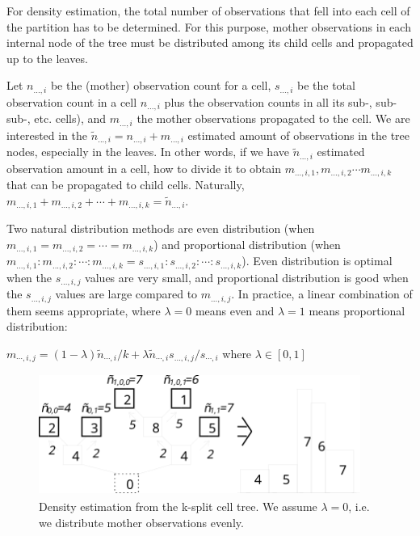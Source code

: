 For density estimation, the total number of observations that
fell into each cell of the partition has to be determined. For
this purpose, mother observations in each internal node of the
tree must be distributed among its child cells and propagated
up to the leaves.


Let $n_{...,i}$ be the (mother) observation count for a cell,
$s_{...,i}$ be the total observation count in a cell $n_{...,i}$ plus
the observation counts in all its sub-, sub-sub-, etc. cells), and
$m_{...,i}$ the mother observations propagated to the cell. We are
interested in the $\tilde{n}_{...,i} = n_{...,i} + m_{...,i}$
estimated amount of observations in the tree nodes, especially in the
leaves. In other words, if we have $\tilde{n}_{...,i}$ estimated
observation amount in a cell, how to divide it to obtain
$m_{...,i,1}, m_{...,i,2} \cdots m_{...,i,k}$
that can be propagated to child cells. Naturally,
$m_{...,i,1} + m_{...,i,2} + \cdots + m_{...,i,k} = \tilde{n}_{...,i}$.


Two natural distribution methods are even
distribution (when
$m_{...,i,1} = m_{...,i,2} = \cdots = m_{...,i,k}$) and proportional
distribution (when
$m_{...,i,1} : m_{...,i,2} : \cdots : m_{...,i,k} = s_{...,i,1} : s_{...,i,2} : \cdots : s_{...,i,k}$).
Even distribution is optimal when the
$s_{...,i,j}$ values are very small, and proportional distribution is
good when the $s_{...,i,j}$ values are large compared to
$m_{...,i,j}$. In practice, a linear combination of them seems
appropriate, where $\lambda=0$ means even and $\lambda=1$ means
proportional distribution:


$m_{\cdots,i,j} = (1-\lambda)\tilde{n}_{\cdots,i}/k + \lambda \tilde{n}_{\cdots,i} s_{...,i,j} / s_{\cdots,i}$
where $\lambda\in[0,1]$

\begin{figure}[htbp]
  \begin{center}
    \includegraphics[width=4.147in, height=1.567in]{figures/simlib-ksplit2}
    \caption{Density estimation from the k-split cell tree. We
      assume $\lambda=0$, i.e. we distribute mother observations
      evenly.}
  \end{center}
\end{figure}

